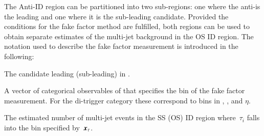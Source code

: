 {%
  \newcommand*{\ffargs}{\ensuremath{( \myvec{x}_{\tau} )}\xspace}

  \newcommand*{\NmjID}[2]{\ensuremath{N_\text{multi-jet}^{\text{#1, loose }\tau_{#2}}}\xspace}
  \newcommand*{\NmjIDIncl}[1]{\ensuremath{N_\text{multi-jet}^{\text{#1, ID}}}\xspace}

  \newcommand*{\NmjAntiIDIncl}[1]{\ensuremath{N_\text{multi-jet}^{\text{#1, Anti-ID}}}\xspace}
  \newcommand*{\NmjAntiID}[2]{\ensuremath{N_\text{multi-jet}^{\text{#1, anti-}\tau_{#2}}}\xspace}

  The Anti-ID region can be partitioned into two sub-regions: one
  where the anti-\tauhadvis is the leading and one where it is the
  sub-leading \tauhadvis candidate. Provided the conditions for the
  fake factor method are fulfilled, both regions can be used to obtain
  separate estimates of the multi-jet background in the OS ID
  region. The notation used to describe the fake factor measurement is
  introduced in the following:
  \begin{description}[style=standard]
  \item[$\tau_0$ ($\tau_1$)] The \tauhadvis candidate leading (sub-leading) in \pT.

  \item[$\myvec{x}_\tau$] A vector of categorical observables of
    \tauhadvis that specifies the bin of the fake factor
    measurement. For the di-\tauhadvis trigger category these
    correspond to bins in \Ntracks, \pT, and $\eta$.

  \item[$\NmjID{SS(OS)}{i}\ffargs$] The estimated number of multi-jet
    events in the SS (OS) ID region where~$\tau_i$ falls into the bin
    specified by~$\myvec{x}_\tau$.


\end{description}}
